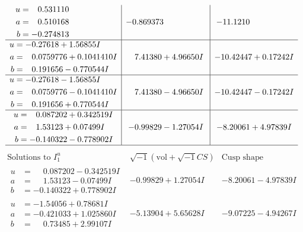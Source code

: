 \documentclass[1p]{elsarticle_modified}
\theoremstyle{definition}
\newcommand{\I}{\sqrt{-1}}
\begin{document}
$$\begin{array}{c|c|c}
\begin{aligned}
u &= \phantom{-}0.531110\phantom{ +0.000000I} \\
a &= \phantom{-}0.510168\phantom{ +0.000000I} \\
b &= -0.274813\phantom{ +0.000000I}\end{aligned}
 & -0.869373\phantom{ +0.000000I} & -11.1210\phantom{ +0.000000I} \\ \hline\begin{aligned}
u &= -0.27618 + 1.56855 I \\
a &= \phantom{-}0.0759776 + 0.1041410 I \\
b &= \phantom{-}0.191656 - 0.770544 I\end{aligned}
 & \phantom{-}7.41380 + 4.96650 I & -10.42447 + 0.17242 I \\ \hline\begin{aligned}
u &= -0.27618 - 1.56855 I \\
a &= \phantom{-}0.0759776 - 0.1041410 I \\
b &= \phantom{-}0.191656 + 0.770544 I\end{aligned}
 & \phantom{-}7.41380 - 4.96650 I & -10.42447 - 0.17242 I \\ \hline\begin{aligned}
u &= \phantom{-}0.087202 + 0.342519 I \\
a &= \phantom{-}1.53123 + 0.07499 I \\
b &= -0.140322 - 0.778902 I\end{aligned}
 & -0.99829 - 1.27054 I & -8.20061 + 4.97839 I\\
 \hline 
 \end{array}$$\newpage$$\begin{array}{c|c|c}  
\text{Solutions to }I^u_{1}& \I (\text{vol} + \sqrt{-1}CS) & \text{Cusp shape}\\
 \hline 
\begin{aligned}
u &= \phantom{-}0.087202 - 0.342519 I \\
a &= \phantom{-}1.53123 - 0.07499 I \\
b &= -0.140322 + 0.778902 I\end{aligned}
 & -0.99829 + 1.27054 I & -8.20061 - 4.97839 I \\ \hline\begin{aligned}
u &= -1.54056 + 0.78681 I \\
a &= -0.421033 + 1.025860 I \\
b &= \phantom{-}0.73485 + 2.99107 I\end{aligned}
 & -5.13904 + 5.65628 I & -9.07225 - 4.94267 I \\ \hline\begin{aligned}

\end{aligned}
\end{array}$$
\end{document}

